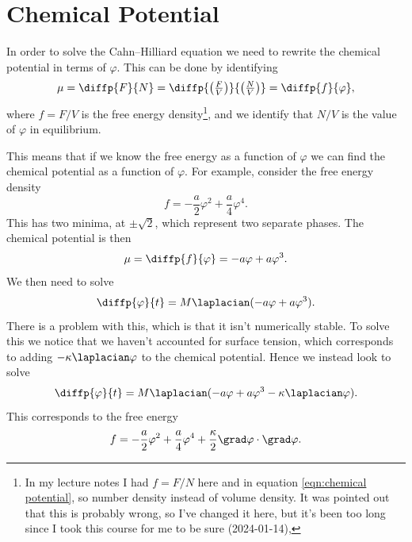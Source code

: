 \documentclass[fleqn]{NotesClass}
\begin{document}
    \section{Chemical Potential}
    In order to solve the Cahn--Hilliard equation we need to rewrite the chemical potential in terms of \(\varphi\).
    This can be done by identifying
    \begin{equation}\label{eqn:chemical potential}
        \mu = \diffp{F}{N} = \diffp{\left( \tfrac{F}{V} \right)}{\left( \tfrac{N}{V} \right)} = \diffp{f}{\varphi},
    \end{equation}
    where \(f = F/V\) is the free energy density\footnote{In my lecture notes I had \(f = F/N\) here and in equation \cref{eqn:chemical potential}, so number density instead of volume density. It was pointed out that this is probably wrong, so I've changed it here, but it's been too long since I took this course for me to be sure (2024-01-14),}, and we identify that \(N/V\) is the value of \(\varphi\) in equilibrium.
    
    This means that if we know the free energy as a function of \(\varphi\) we can find the chemical potential as a function of \(\varphi\).
    For example, consider the free energy density
    \begin{equation}
        f = -\frac{a}{2}\varphi^2 + \frac{a}{4}\varphi^4.
    \end{equation}
    This has two minima, at \(\pm\sqrt{2}\), which represent two separate phases.
    The chemical potential is then
    \begin{equation}
        \mu = \diffp{f}{\varphi} = -a\varphi + a\varphi^3.
    \end{equation}
    We then need to solve
    \begin{equation}
        \diffp{\varphi}{t} = M\laplacian(-a\varphi + a\varphi^3).
    \end{equation}
    There is a problem with this, which is that it isn't numerically stable.
    To solve this we notice that we haven't accounted for surface tension, which corresponds to adding \(-\kappa \laplacian\varphi\) to the chemical potential.
    Hence we instead look to solve
    \begin{equation}
        \diffp{\varphi}{t} = M\laplacian (-a\varphi + a\varphi^3 - \kappa\laplacian\varphi).
    \end{equation}
    This corresponds to the free energy
    \begin{equation}
        f = -\frac{a}{2}\varphi^2 + \frac{a}{4}\varphi^4 + \frac{\kappa}{2}\grad\varphi \cdot \grad\varphi.
    \end{equation}
    
\end{document}
